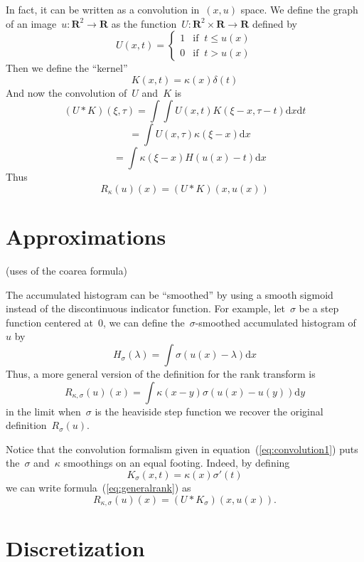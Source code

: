 \documentclass[12pt]{article}                  %
\begin{document}
In fact, it can be written as a convolution in~$(x,u)$ space.  We define the
graph of an image~$u:\mathbf{R}^2\to\mathbf{R}$ as the
function~$U:\mathbf{R}^2\times\mathbf{R}\to\mathbf{R}$ defined by
\[
	U(x,t) = \begin{cases}
		1 & \textrm{if $\ t\le u(x)$} \\
		0 & \textrm{if $\ t> u(x)$}
	\end{cases}
\]
Then we define the ``kernel''
\[
	K(x,t) = \kappa(x)\delta(t)
\]
And now the convolution of~$U$ and~$K$ is
\[
	(U*K)(\xi,\tau)
	=
	\int
	\int U\left(x,t\right)K\left(\xi-x,\tau-t\right)
		\mathrm{d} x
		\mathrm{d} t
\]
\[
	\quad
	=\int
	U(x,\tau)
	\kappa(\xi - x)
		\mathrm{d} x
\]
\[
	\quad
	=\int\kappa(\xi-x)H(u(x)-t)
		\mathrm{d} x
\]
Thus
\begin{equation}\label{eq:convolution1}
	R_\kappa(u)(x)=(U*K)(x,u(x))
\end{equation}

\section{Approximations}

(uses of the coarea formula)

The accumulated histogram can be ``smoothed'' by using a smooth sigmoid instead
of the discontinuous indicator function.  For example, let~$\sigma$ be a step
function centered at~$0$, we can define the~$\sigma$-smoothed accumulated
histogram of~$u$ by
\[
H_\sigma(\lambda)=\int\sigma(u(x)-\lambda)\mathrm{d}x
\]
Thus, a more general version of the definition for the rank transform is
\begin{equation}\label{eq:generalrank}
R_{\kappa,\sigma}(u)(x)=\int \kappa(x-y)\sigma(u(x)-u(y))\mathrm{d}y
\end{equation}
in the limit when~$\sigma$ is the heaviside step function we recover the
original definition~$R_\sigma(u)$.

Notice that the convolution formalism given in
equation~(\ref{eq:convolution1}) puts the~$\sigma$ and~$\kappa$ smoothings
on an equal footing.  Indeed, by defining
\[
	K_\sigma(x,t)=\kappa(x)\sigma'(t)
\]
we can write formula~(\ref{eq:generalrank}) as
\begin{equation}\label{eq:convolution2}
	R_{\kappa,\sigma}(u)(x)=(U*K_\sigma)(x,u(x)).
\end{equation}

\section{Discretization}
\end{document}
